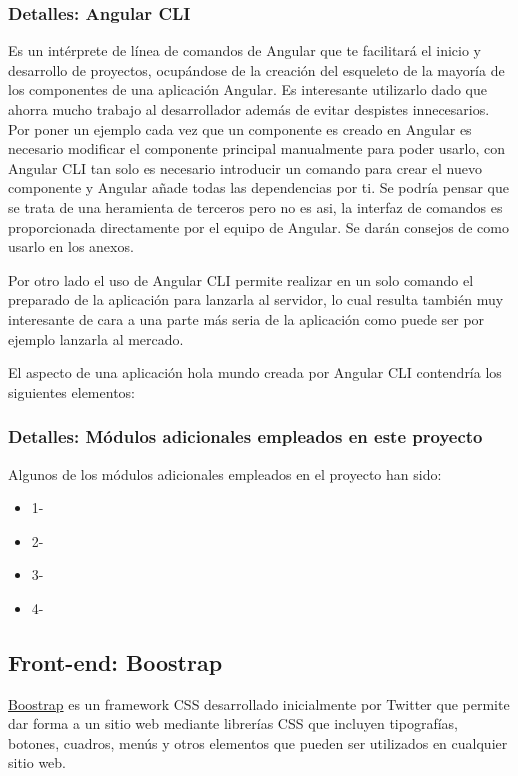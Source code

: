 \subsubsection{Detalles: Angular CLI}\label{detalle-angularcli}
Es un intérprete de línea de comandos de Angular que te facilitará el inicio y desarrollo de proyectos, ocupándose de la creación del esqueleto de la mayoría de los componentes de una aplicación Angular. Es interesante utilizarlo dado que ahorra mucho trabajo al desarrollador además de evitar despistes innecesarios. Por poner un ejemplo cada vez que un componente es creado en Angular es necesario modificar el componente principal manualmente para poder usarlo, con Angular CLI tan solo es necesario introducir un comando para crear el nuevo componente y Angular añade todas las dependencias por ti. Se podría pensar que se trata de una heramienta de terceros pero no es asi, la interfaz de comandos es proporcionada directamente por el equipo de Angular. Se darán consejos de como usarlo en los anexos.

Por otro lado el uso de Angular CLI permite realizar en un solo comando el preparado de la aplicación para lanzarla al servidor, lo cual resulta también muy interesante de cara a una parte más seria de la aplicación como puede ser por ejemplo lanzarla al mercado.

El aspecto de una aplicación hola mundo creada por Angular CLI contendría los siguientes elementos:



\subsubsection{Detalles: Módulos adicionales empleados en este proyecto}\label{detalle-angularmodulos}
Algunos de los módulos adicionales empleados en el proyecto han sido:
\begin{itemize}
\tightlist
\item
1-
\item
2-
\item
3-
  \item
4-
\end{itemize}

\subsection{Front-end: Boostrap}\label{tecnologias-boostrap}
\hyperlink{https://www.getbootstrap.com/}{Boostrap} es un framework CSS desarrollado inicialmente  por Twitter que permite dar forma a un sitio web mediante librerías CSS que incluyen tipografías, botones, cuadros, menús y otros elementos que pueden ser utilizados en cualquier sitio web.

